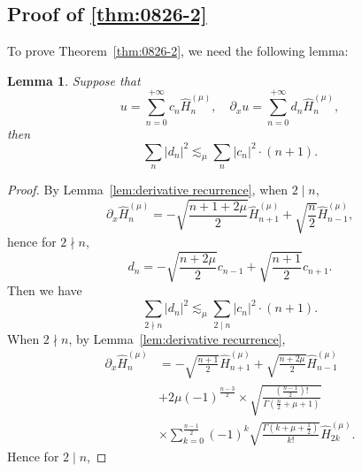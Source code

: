 \documentclass[pdflatex,sn-aps]{sn-jnl}%
\theoremstyle{thmstyleone}%
\newtheorem{lemma}{Lemma}[section]
\theoremstyle{thmstyletwo}%
\theoremstyle{thmstylethree}%
\begin{document}
\begin{appendices}
\section{Proof of \autoref{thm:0826-2}}
\label{appendix:A}
To prove Theorem~\ref{thm:0826-2}, we need the following lemma:
\begin{lemma}\label{lem:0826-1}
  Suppose that
  \begin{displaymath}
    u=\sum_{n=0}^{+\infty} c_n \widehat{H}_n^{(\mu)}, \quad \partial_x u=\sum_{n=0}^{+\infty} d_n \widehat{H}_n^{(\mu)},
  \end{displaymath}
  then
  \begin{equation}\label{eq:0826-1}
    \sum_n\left|d_n\right|^2 \lesssim_\mu \sum_n\left|c_n\right|^2 \cdot(n+1).
  \end{equation}
\end{lemma}
\begin{proof}
  By Lemma~\ref{lem:derivative recurrence}, when $2 \mid n$,
  \begin{equation}\label{eq:0826-2}
    \partial_x \widehat{H}_n^{(\mu)}=-\sqrt{\frac{n+1+2 \mu}{2}} \widehat{H}_{n+1}^{(\mu)}+\sqrt{\frac{n}{2}} \widehat{H}_{n-1}^{(\mu)},
  \end{equation}
  hence for $2 \nmid n$,
  \begin{equation}\label{eq:0826-3}
    d_n=-\sqrt{\frac{n+2 \mu}{2}} c_{n-1}+\sqrt{\frac{n+1}{2}} c_{n+1}.
  \end{equation}
  Then we have
  \begin{equation}\label{eq:0826-14}
    \sum_{2 \nmid n}\left|d_n\right|^2 \lesssim_\mu \sum_{2 \mid n}\left|c_n\right|^2 \cdot(n+1).
  \end{equation}
  When $2 \nmid n$, by Lemma~\ref{lem:derivative recurrence},
  \begin{equation}\label{eq:0826-5}
    \begin{aligned}
    \partial_x \widehat{H}_n^{(\mu)} & =-\sqrt{\frac{n+1}{2}} \widehat{H}_{n+1}^{(\mu)}+\sqrt{\frac{n+2 \mu}{2}} \widehat{H}_{n-1}^{(\mu)} \\
    & +2 \mu(-1)^{\frac{n-3}{2}} \times \sqrt{\frac{\left(\frac{n-1}{2}\right)!}{\Gamma\left(\frac{n}{2}+\mu+1\right)}} \\
    & \times \sum_{k=0}^{\frac{n-1}{2}}(-1)^k \sqrt{\frac{\Gamma\left(k+\mu+\frac{1}{2}\right)}{k!}} \widehat{H}_{2 k}^{(\mu)}.
    \end{aligned}
  \end{equation}
  Hence for $2 \mid n$,

\end{proof}
\end{appendices}
\end{document}
